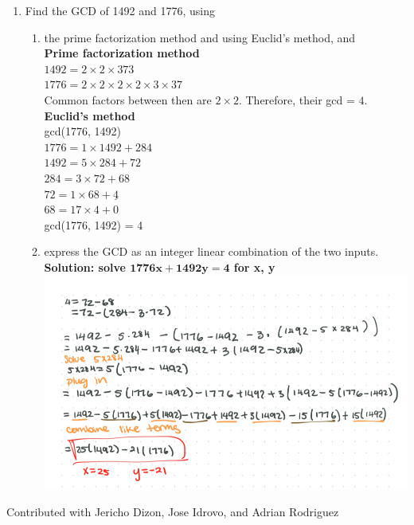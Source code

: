 \documentclass{article}
\begin{document}
    \begin{enumerate}[label=\textbf{Q3}]
        \item Find the GCD of 1492 and 1776, using
        \begin{enumerate}[label=(\alph*)]
            \item the prime factorization method and using Euclid's method, and\\
            \textbf{Prime factorization method}\\
            $1492 = 2 \times 2 \times 373$\\
            $1776 = 2 \times 2 \times 2 \times 2 \times 3 \times 37$\\
            Common factors between then are $2 \times 2$. Therefore, their gcd = $4$.\\
            \textbf{Euclid's method}\\
            gcd(1776, 1492)\\
            $1776 = 1 \times 1492 + 284$\\
            $1492 = 5 \times 284 + 72$\\
            $284 = 3 \times 72 + 68$\\
            $72 = 1 \times 68 + \underline{4}$\\
            $68 = 17 \times 4 + 0$\\
            gcd(1776, 1492) = 4
            \item express the GCD as an integer linear combination of the two inputs.\\
            \textbf{Solution: solve $\mathbf{1776x + 1492y = 4}$ for x, y}\\
            \noindent \includegraphics[scale=0.3]{problem3_b.png}
        \end{enumerate}
    \end{enumerate}
    Contributed with Jericho Dizon, Jose Idrovo, and Adrian Rodriguez
\end{document}

